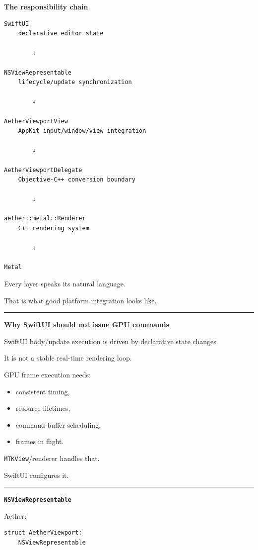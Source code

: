\textbf{The responsibility chain}

\begin{verbatim}
SwiftUI
    declarative editor state

        ↓

NSViewRepresentable
    lifecycle/update synchronization

        ↓

AetherViewportView
    AppKit input/window/view integration

        ↓

AetherViewportDelegate
    Objective-C++ conversion boundary

        ↓

aether::metal::Renderer
    C++ rendering system

        ↓

Metal
\end{verbatim}

Every layer speaks its natural language.

That is what good platform integration looks like.

\begin{center}\rule{0.5\linewidth}{0.5pt}\end{center}

\textbf{Why SwiftUI should not issue GPU commands}

SwiftUI body/update execution is driven by declarative state changes.

It is not a stable real-time rendering loop.

GPU frame execution needs:

\begin{itemize}
\tightlist
\item
  consistent timing,
\item
  resource lifetimes,
\item
  command-buffer scheduling,
\item
  frames in flight.
\end{itemize}

\texttt{MTKView}/renderer handles that.

SwiftUI configures it.

\begin{center}\rule{0.5\linewidth}{0.5pt}\end{center}

\textbf{\texttt{NSViewRepresentable}}

Aether:

\begin{verbatim}
struct AetherViewport:
    NSViewRepresentable
\end{verbatim}

